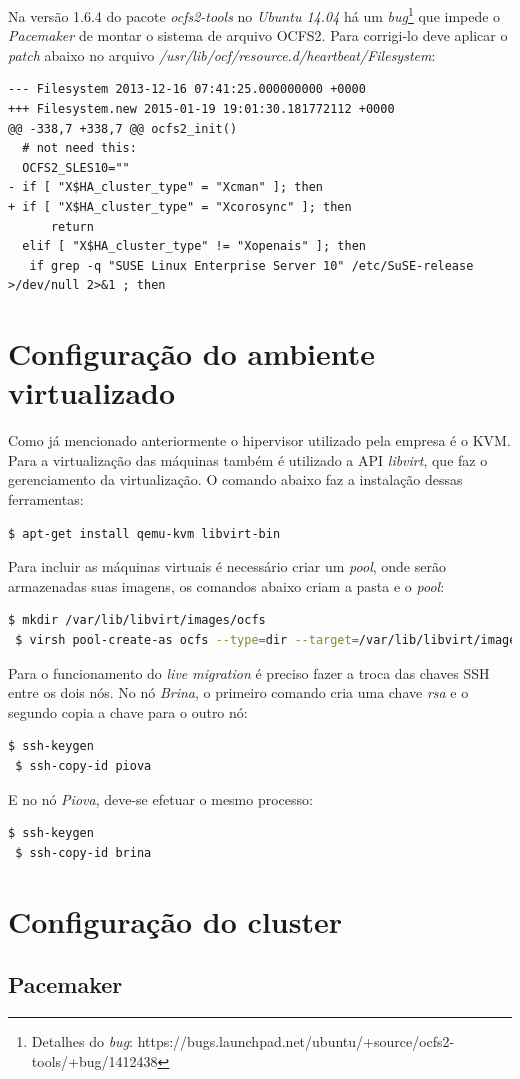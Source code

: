 Na versão 1.6.4 do pacote \textit{ocfs2-tools} no \textit{Ubuntu 14.04} há um \textit{bug}\footnote{Detalhes do \textit{bug}: 
https://bugs.launchpad.net/ubuntu/+source/ocfs2-tools/+bug/1412438} que impede o \textit{Pacemaker} de montar o sistema de arquivo \ac{OCFS2}. 
Para corrigi-lo deve aplicar o \textit{patch} abaixo no arquivo \textit{/usr/lib/ocf/resource.d/heartbeat/Filesystem}:
\begin{lstlisting}
--- Filesystem 2013-12-16 07:41:25.000000000 +0000
+++ Filesystem.new 2015-01-19 19:01:30.181772112 +0000
@@ -338,7 +338,7 @@ ocfs2_init()
  # not need this:
  OCFS2_SLES10=""
- if [ "X$HA_cluster_type" = "Xcman" ]; then
+ if [ "X$HA_cluster_type" = "Xcorosync" ]; then
      return
  elif [ "X$HA_cluster_type" != "Xopenais" ]; then
   if grep -q "SUSE Linux Enterprise Server 10" /etc/SuSE-release >/dev/null 2>&1 ; then
\end{lstlisting}

\section{Configuração do ambiente virtualizado}

Como já mencionado anteriormente o hipervisor utilizado pela empresa é o \ac{KVM}. Para a virtualização das máquinas também é utilizado a 
\ac{API} \textit{libvirt}, que faz o gerenciamento da virtualização. O comando abaixo faz a instalação dessas ferramentas:
\begin{lstlisting}[language=bash]
 $ apt-get install qemu-kvm libvirt-bin
\end{lstlisting}

Para incluir as máquinas virtuais é necessário criar um \textit{pool}, onde serão armazenadas suas imagens, os comandos abaixo criam a pasta
e o \textit{pool}:
\begin{lstlisting}[language=bash]
 $ mkdir /var/lib/libvirt/images/ocfs
 $ virsh pool-create-as ocfs --type=dir --target=/var/lib/libvirt/images/ocfs
\end{lstlisting}

Para o funcionamento do \textit{live migration} é preciso fazer a troca das chaves \ac{SSH} entre os dois nós.
No nó \textit{Brina}, o primeiro comando cria uma chave \textit{rsa} e o segundo copia a chave para o outro nó:
\begin{lstlisting}[language=bash]
 $ ssh-keygen
 $ ssh-copy-id piova
\end{lstlisting}

E no nó \textit{Piova}, deve-se efetuar o mesmo processo:
\begin{lstlisting}[language=bash]
 $ ssh-keygen
 $ ssh-copy-id brina
\end{lstlisting}

\section{Configuração do cluster}
\label{section:configpacemaker}


\subsection{Pacemaker}

